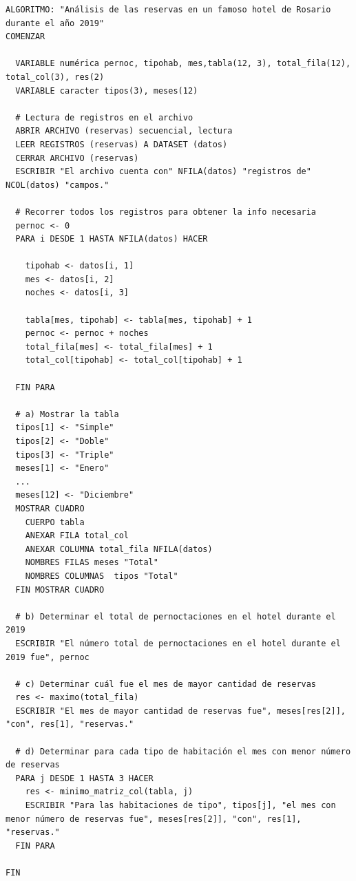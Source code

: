 \documentclass[
]{book}
\begin{document}
\begin{verbatim}
ALGORITMO: "Análisis de las reservas en un famoso hotel de Rosario durante el año 2019"
COMENZAR
    
  VARIABLE numérica pernoc, tipohab, mes,tabla(12, 3), total_fila(12), total_col(3), res(2)
  VARIABLE caracter tipos(3), meses(12)

  # Lectura de registros en el archivo
  ABRIR ARCHIVO (reservas) secuencial, lectura
  LEER REGISTROS (reservas) A DATASET (datos)
  CERRAR ARCHIVO (reservas)
  ESCRIBIR "El archivo cuenta con" NFILA(datos) "registros de" NCOL(datos) "campos." 

  # Recorrer todos los registros para obtener la info necesaria
  pernoc <- 0
  PARA i DESDE 1 HASTA NFILA(datos) HACER
    
    tipohab <- datos[i, 1]
    mes <- datos[i, 2]
    noches <- datos[i, 3]
    
    tabla[mes, tipohab] <- tabla[mes, tipohab] + 1
    pernoc <- pernoc + noches
    total_fila[mes] <- total_fila[mes] + 1
    total_col[tipohab] <- total_col[tipohab] + 1
    
  FIN PARA

  # a) Mostrar la tabla
  tipos[1] <- "Simple"
  tipos[2] <- "Doble"
  tipos[3] <- "Triple"
  meses[1] <- "Enero"
  ...
  meses[12] <- "Diciembre"
  MOSTRAR CUADRO
    CUERPO tabla
    ANEXAR FILA total_col
    ANEXAR COLUMNA total_fila NFILA(datos)
    NOMBRES FILAS meses "Total"
    NOMBRES COLUMNAS  tipos "Total"
  FIN MOSTRAR CUADRO

  # b) Determinar el total de pernoctaciones en el hotel durante el 2019
  ESCRIBIR "El número total de pernoctaciones en el hotel durante el 2019 fue", pernoc

  # c) Determinar cuál fue el mes de mayor cantidad de reservas
  res <- maximo(total_fila)
  ESCRIBIR "El mes de mayor cantidad de reservas fue", meses[res[2]], "con", res[1], "reservas."

  # d) Determinar para cada tipo de habitación el mes con menor número de reservas
  PARA j DESDE 1 HASTA 3 HACER
    res <- minimo_matriz_col(tabla, j)
    ESCRIBIR "Para las habitaciones de tipo", tipos[j], "el mes con menor número de reservas fue", meses[res[2]], "con", res[1], "reservas."
  FIN PARA
   
FIN
\end{verbatim}
\end{document}
